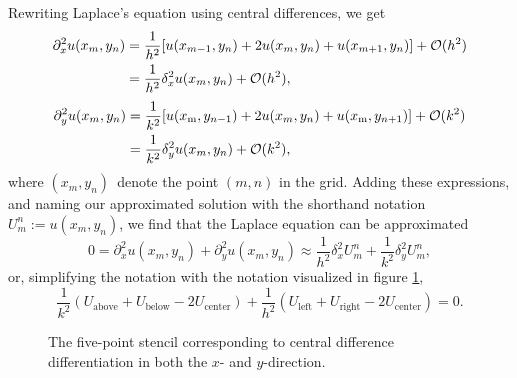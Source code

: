 Rewriting Laplace's equation using central differences, we get
\begin{equation*}
    \begin{split}
    \partial^2_x u(x_m, y_n) 
        &= \frac{1}{h^2}[u(x_{m-1},y_n) + 2u(x_m,y_n) + u(x_{m+1},y_n)] + \mathcal{O}(h^2)\\
        &= \frac{1}{h^2}\delta^2_x u(x_m,y_n) + \mathcal{O}(h^2),\\
    \end{split}
\end{equation*}
\begin{equation*}
    \begin{split}
    \partial^2_y u(x_m, y_n) 
        &= \frac{1}{k^2}[u(x_\text{m},y_{n-1}) + 2u(x_m,y_n) + u(x_\text{m},y_{n+1})] + \mathcal{O}(k^2)\\
        &= \frac{1}{k^2}\delta^2_y u(x_m,y_n) + \mathcal{O}(k^2),\\
    \end{split}
\end{equation*}
where $(x_m, y_n)$ denote the point $(m,n)$ in the grid. 
Adding these expressions, and naming our approximated solution with the shorthand notation $U_m^n := u(x_m,y_n)$, we find that the Laplace equation can be approximated 
\begin{equation*}
    0 = \partial^2_x u(x_m,y_n) + \partial^2_y u(x_m,y_n)
    \approx \frac{1}{h^2}\delta^2_x U_m^n + \frac{1}{k^2}\delta^2_y U_m^n,
\end{equation*}
or, simplifying the notation with the notation visualized in figure \ref{ex3:fig:stencil},
\begin{equation*}
    \frac{1}{k^2}(U_\text{above} + U_\text{below} - 2U_\text{center}) + \frac{1}{h^2}(U_\text{left} + U_\text{right} - 2U_\text{center}) = 0.
\end{equation*}

\begin{figure}[htb]
    \centering
    
    \caption{The five-point stencil corresponding to central difference differentiation in both the $x$- and $y$-direction.}
    \label{ex3:fig:stencil}
\end{figure}

